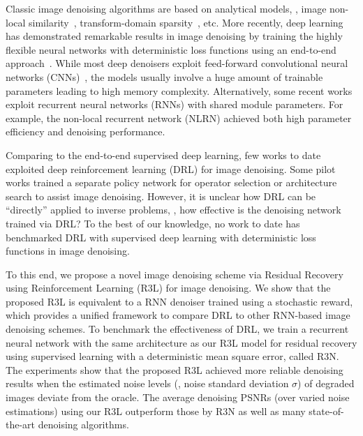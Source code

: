 \documentclass{article}
\begin{document}
Classic image denoising algorithms are based on analytical models, \eg, image non-local similarity~\cite{10.1007/978-3-642-04146-4_9,dabov2007image,6909762}, transform-domain sparsity~\cite{liu2017image,wen2015structured}, etc.
More recently, deep learning has demonstrated remarkable results in image denoising by training the highly flexible neural networks with deterministic loss functions using an end-to-end approach~\cite{guo2019toward, Chen_2017,Zhang_2017,liu2018non}.
While most deep denoisers exploit feed-forward convolutional neural networks (CNNs)~\cite{Zhang_2017}, the models usually involve a huge amount of trainable parameters leading to high memory complexity.
Alternatively, some recent works exploit recurrent neural networks (RNNs) with shared module parameters. For example, the non-local recurrent network (NLRN) \cite{liu2018non} achieved both high parameter efficiency and denoising performance.




Comparing to the end-to-end supervised deep learning, few works to date exploited deep reinforcement learning (DRL) for image denoising.
Some pilot works trained a separate policy network for operator selection \cite{yu2018crafting,furuta2019fully} or architecture search \cite{yu2019pathrestore, vassilo2020multi} to assist image denoising.
However, it is unclear how DRL can be ``directly'' applied to inverse problems, \eg, how effective is the denoising network trained via DRL?
To the best of our knowledge, no work to date has benchmarked DRL with supervised deep learning with deterministic loss functions in image denoising.

To this end, we propose a novel image denoising scheme via Residual Recovery using Reinforcement Learning (R3L) for image denoising.
We show that the proposed R3L is equivalent to a RNN denoiser trained using a stochastic reward, which provides a unified framework to compare DRL to other RNN-based image denoising schemes.
To benchmark the effectiveness of DRL, we train a recurrent neural network with the same architecture as our R3L model for residual recovery using supervised learning with a deterministic mean square error, called R3N.
The experiments show that the proposed R3L achieved more reliable denoising results when the estimated noise levels (\ie, noise standard deviation $\sigma$) of degraded images deviate from the oracle. 
The average denoising PSNRs (over varied noise estimations) using our R3L outperform those by R3N as well as many state-of-the-art denoising algorithms. 
\end{document}
